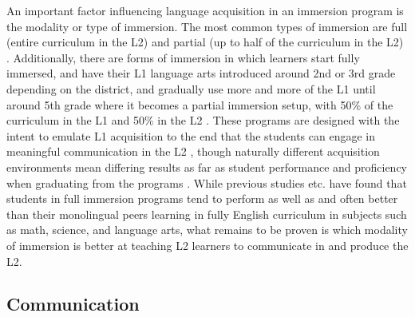 \documentclass[
  a4paper,
  11pt,
  twocolumn]{article}
\begin{document}
An important factor influencing language acquisition in an immersion
program is the modality or type of immersion. The most common types of
immersion are full (entire curriculum in the L2) and partial (up to half
of the curriculum in the L2) \cite{genesee_second_1985}. Additionally,
there are forms of immersion in which learners start fully immersed, and
have their L1 language arts introduced around 2nd or 3rd grade depending
on the district, and gradually use more and more of the L1 until around
5th grade where it becomes a partial immersion setup, with 50\% of the
curriculum in the L1 and 50\% in the L2 \cite{genesee_second_1985}.
These programs are designed with the intent to emulate L1 acquisition to
the end that the students can engage in meaningful communication in the
L2 \cite{macnamara_nurseries_1973}, though naturally different
acquisition environments mean differing results as far as student
performance and proficiency when graduating from the programs
\cite{parks_effects_2020}. While previous studies
\cite{lambert_cognitive_1969}etc. have found that students in full
immersion programs tend to perform as well as and often better than
their monolingual peers learning in fully English curriculum
\cite{campbell_review_1984} in subjects such as math, science, and
language arts, what remains to be proven is which modality of immersion
is better at teaching L2 learners to communicate in and produce the L2.

\subsection{Communication}
\end{document}
